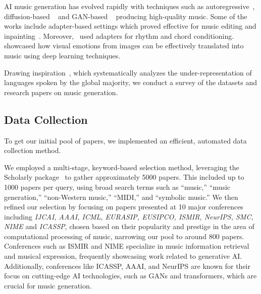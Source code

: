 AI music generation has evolved rapidly with techniques such as autoregressive~\cite{agostinelli2023musiclm,c:23,ziv2024masked}, diffusion-based ~\cite{c:24,huang2023noise2music,li2024jen} and GAN-based ~\cite{dong2018musegan,li2021inco} producing high-quality music. Some of the works include adapter-based settings which proved effective for music editing and inpainting~\cite{lin2024arrange, zhang2024instruct}. Moreover,~\citet{lan2024musicongen} used adapters for rhythm and chord conditioning. ~\citet{tan2020automated} showcased how visual emotions from images can be effectively translated into music using deep learning techniques.

Drawing inspiration~\citet{c:27}, which systematically analyzes the under-representation of languages spoken by the global majority, we conduct a survey of the datasets and research papers on music generation.

\subsection{Data Collection}
To get our initial pool of papers, we implemented an efficient, automated data collection method.

We employed a multi-stage, keyword-based selection method, leveraging the Scholarly package~\citet{cholewiak2021scholarly} to gather approximately 5000 papers. This included up to 1000 papers per query, using broad search terms such as “music,” “music generation,” “non-Western music,” “MIDI,” and “symbolic music.” We then refined our selection by focusing on papers presented at 10 major conferences including \textit{IJCAI, AAAI, ICML, EURASIP, EUSIPCO, ISMIR, NeurIPS, SMC, NIME} and \textit{ICASSP}, chosen based on their popularity and prestige in the area of computational processing of music, narrowing our pool to around 800 papers. Conferences such as ISMIR and NIME specialize in music information retrieval and musical expression, frequently showcasing work related to generative AI. Additionally, conferences like ICASSP, AAAI, and NeurIPS are known for their focus on cutting-edge AI technologies, such as GANs and transformers, which are crucial for music generation.

